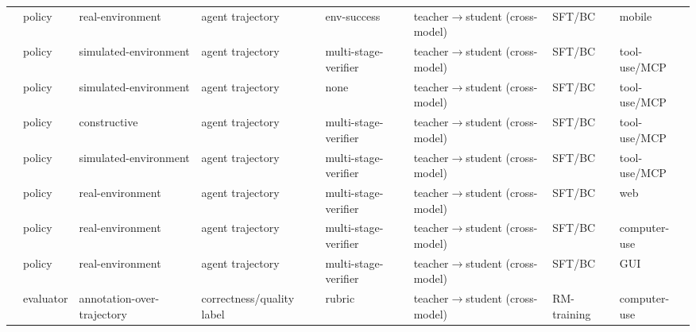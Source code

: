 \begin{table}[htbp]
{\begin{tabular}{@{}llllllll@{}}
\cite{Che26d}                       & policy    & real-environment       & agent trajectory                  & env-success            & teacher$\to$student (cross-model) & SFT/BC     & mobile          \\
\cite{Pra25b}                       & policy    & simulated-environment  & agent trajectory                  & multi-stage-verifier   & teacher$\to$student (cross-model) & SFT/BC     & tool-use/MCP    \\
\cite{Tan23}                        & policy    & simulated-environment  & agent trajectory                  & none                   & teacher$\to$student (cross-model) & SFT/BC     & tool-use/MCP    \\
\cite{Liu24n}                       & policy    & constructive           & agent trajectory                  & multi-stage-verifier   & teacher$\to$student (cross-model) & SFT/BC     & tool-use/MCP    \\
\cite{Liu24o}                       & policy    & simulated-environment  & agent trajectory                  & multi-stage-verifier   & teacher$\to$student (cross-model) & SFT/BC     & tool-use/MCP    \\
\cite{Fai26}                        & policy    & real-environment       & agent trajectory                  & multi-stage-verifier   & teacher$\to$student (cross-model) & SFT/BC     & web             \\
\cite{He25g}            & policy    & real-environment       & agent trajectory                  & multi-stage-verifier   & teacher$\to$student (cross-model) & SFT/BC     & computer-use    \\
\cite{Wei26b}                       & policy    & real-environment       & agent trajectory                  & multi-stage-verifier   & teacher$\to$student (cross-model) & SFT/BC     & GUI             \\
\cite{He25g}    & evaluator & annotation-over-trajectory & correctness/quality label    & rubric                 & teacher$\to$student (cross-model) & RM-training & computer-use   \\
\bottomrule
\end{tabular}%
}
\end{table}
